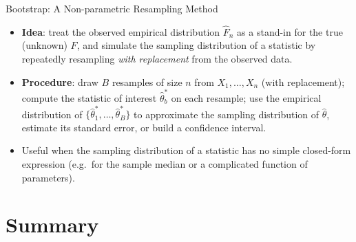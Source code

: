 \documentclass[11pt,aspectratio=169]{beamer}
\begin{document}
\begin{frame}{Bootstrap: A Non-parametric Resampling Method}
\begin{itemize}
    \item \textbf{Idea}: treat the observed empirical distribution
          $\hat F_n$ as a stand-in for the true (unknown) $F$, and simulate
          the sampling distribution of a statistic by repeatedly resampling
          \emph{with replacement} from the observed data.
    \item \textbf{Procedure}: draw $B$ resamples of size $n$ from
          $X_1,\dots,X_n$ (with replacement); compute the statistic of
          interest $\hat\theta^{*}_b$ on each resample; use the empirical
          distribution of $\{\hat\theta^*_1,\dots,\hat\theta^*_B\}$ to
          approximate the sampling distribution of $\hat\theta$, estimate
          its standard error, or build a confidence interval.
    \item Useful when the sampling distribution of a statistic has no
          simple closed-form expression (e.g.\ for the sample median or a
          complicated function of parameters).
\end{itemize}
\end{frame}

\section{Summary}
\end{document}
